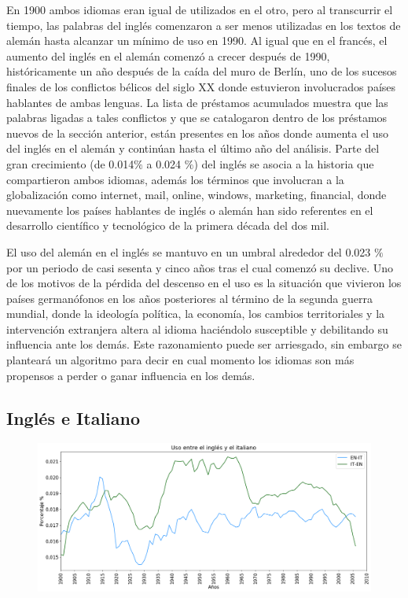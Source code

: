 En 1900 ambos idiomas eran igual de utilizados en el otro, pero al transcurrir el tiempo, las palabras del inglés comenzaron a ser menos utilizadas en los textos de alemán hasta alcanzar un mínimo de uso en 1990.  Al igual que en el francés, el aumento del inglés en el alemán comenzó a crecer después de 1990,  históricamente un año después de la caída del muro de Berlín, uno de los sucesos finales de los conflictos bélicos del siglo XX donde estuvieron involucrados países hablantes de ambas lenguas. La lista de préstamos acumulados muestra que las palabras ligadas a tales conflictos y que se catalogaron dentro de los préstamos nuevos de la sección anterior, están presentes en los años donde aumenta el uso del inglés en el alemán y continúan hasta el último año del análisis. Parte del gran crecimiento (de 0.014$\%$ a 0.024 $\%$) del inglés se asocia a la historia que compartieron ambos idiomas,  además los términos que involucran a la globalización como internet, mail, online, windows, marketing, financial, donde nuevamente los países hablantes de inglés o alemán han sido referentes en el desarrollo  científico y tecnológico de la primera década del dos mil.

El uso  del alemán en el inglés  se mantuvo en un umbral alrededor del 0.023 $\%$  por un periodo de casi sesenta y cinco años tras el cual comenzó su declive. Uno de los motivos de la pérdida del descenso en el uso es la situación que vivieron los países germanófonos en los años posteriores al término de la segunda guerra mundial,  donde la ideología política, la economía, los cambios territoriales y la intervención extranjera altera al idioma haciéndolo susceptible y debilitando su influencia ante los demás.  Este razonamiento puede ser arriesgado, sin embargo se planteará un algoritmo para decir en cual momento los idiomas son más propensos a perder  o ganar influencia en los demás.


\newpage
\subsection{Inglés e Italiano}

\begin{figure}[h!]
	\centering
	\includegraphics[scale=.38]{Cap_4/SF_3_S2_EN.png}
	\label{SF_EI}
	\caption{}
\end{figure}

